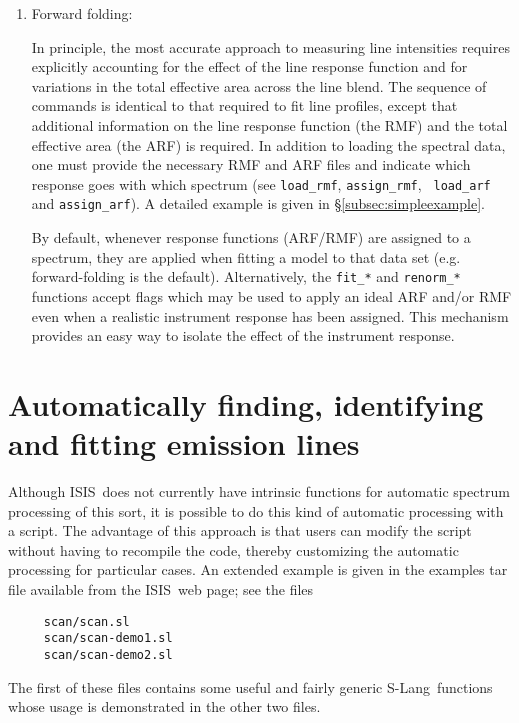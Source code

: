 \documentclass{book}
\newcommand{\isisx}{{\sc ISIS~}}
\newcommand{\slang}{{\sc S-Lang}}
\begin{document}
{\begin{enumerate}
If a better fit is encountered while computing confidence limits,
try re-fitting the data until a stable minimum is found.

\item Forward folding:

In principle, the most accurate approach to measuring line intensities
requires explicitly accounting for the effect of the line response
function and for variations in the total effective area across the
line blend. The sequence of commands is identical to that required to
fit line profiles, except that additional information on the line
response function (the RMF) and the total effective area (the ARF) is
required.  In addition to loading the spectral data, one must provide
the necessary RMF and ARF files and indicate which response goes with
which spectrum (see {\tt load\_rmf}, {\tt assign\_rmf}, {\tt
load\_arf} and {\tt assign\_arf}).  A detailed example is given in
\S\ref{subsec:simpleexample}.

By default, whenever response functions (ARF/RMF) are assigned to a
spectrum, they are applied when fitting a model to that data set (e.g.
forward-folding is the default).  Alternatively, the {\tt fit\_*} and
{\tt renorm\_*} functions accept flags which may be used to apply an
ideal ARF and/or RMF even when a realistic instrument response has
been assigned.  This mechanism provides an easy way to isolate the
effect of the instrument response.

\end{enumerate}

\section{Automatically finding, identifying and fitting emission lines}

Although \isisx does not currently have intrinsic functions for
automatic spectrum processing of this sort, it is possible to do this
kind of automatic processing with a script.  The advantage of this
approach is that users can modify the script without having to
recompile the code, thereby customizing the automatic processing for
particular cases. An extended example is given in the
examples tar file available from the \isisx web page;
see the files
\begin{verbatim}
     scan/scan.sl
     scan/scan-demo1.sl
     scan/scan-demo2.sl
\end{verbatim}
The first of these files contains some useful and fairly generic \slang\ functions
whose usage is demonstrated in the other two files.

}
\end{document}
